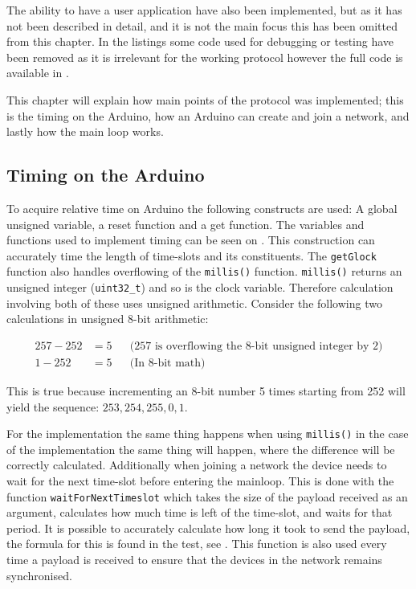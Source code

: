 \noindent
The ability to have a user application have also been implemented, but as it has not been described in detail, and it is not the main focus this has been omitted from this chapter.
In the listings some code used for debugging or testing have been removed as it is irrelevant for the working protocol however the full code is available in . 

This chapter will explain how main points of the protocol was implemented; this is the timing on the Arduino, how an Arduino can create and join a network, and lastly how the main loop works. 

\subsection{Timing on the Arduino}
To acquire relative time on Arduino the following constructs are used: A global unsigned variable, a reset function and a get function.
The variables and functions used to implement timing can be seen on .
This construction can accurately time the length of time-slots and its constituents. 
The \texttt{getGlock} function also handles overflowing of the \texttt{millis()} function. 
\texttt{millis()} returns an unsigned integer (\texttt{uint32\_t}) and so is the clock variable.
Therefore calculation involving both of these uses unsigned arithmetic.
Consider the following two calculations in unsigned 8-bit arithmetic:

\begin{align*}
257 - 252   &= 5 && \text{(257 is overflowing the 8-bit unsigned integer by 2)} \\
1 - 252     &= 5 && \text{(In 8-bit math)}
\end{align*}

\noindent
This is true because incrementing an 8-bit number 5 times starting from 252 will yield the sequence: $253, 254, 255, 0, 1$. 

For the implementation the same thing happens when using \texttt{millis()} in the case of the implementation the same thing will happen, where the difference will be correctly calculated.
Additionally when joining a network the device needs to wait for the next time-slot before entering the mainloop. 
This is done with the function \texttt{waitForNextTimeslot} which takes the size of the payload received as an argument, calculates how much time is left of the time-slot, and waits for that period. 
It is possible to accurately calculate how long it took to send the payload, the formula for this is found in the test, see .
This function is also used every time a payload is received to ensure that the devices in the network remains synchronised. 

